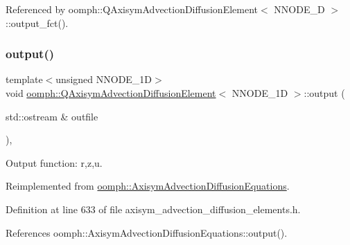 Referenced by oomph\+::\+Q\+Axisym\+Advection\+Diffusion\+Element$<$ N\+N\+O\+D\+E\+\_\+D $>$\+::output\+\_\+fct().

\mbox{\label{classoomph_1_1QAxisymAdvectionDiffusionElement_a398cd25b07bc4709163369e2db6e8202}} 
\subsubsection{\texorpdfstring{output()}{output()}\hspace{0.1cm}{\footnotesize\ttfamily [1/4]}}
{\footnotesize\ttfamily template$<$unsigned N\+N\+O\+D\+E\+\_\+1D$>$ \\
void \hyperlink{classoomph_1_1QAxisymAdvectionDiffusionElement}{oomph\+::\+Q\+Axisym\+Advection\+Diffusion\+Element}$<$ N\+N\+O\+D\+E\+\_\+1D $>$\+::output (\begin{DoxyParamCaption}\item[{std\+::ostream \&}]{outfile }\end{DoxyParamCaption})\hspace{0.3cm}{\ttfamily [inline]}, {\ttfamily [virtual]}}



Output function\+: r,z,u. 



Reimplemented from \hyperlink{classoomph_1_1AxisymAdvectionDiffusionEquations_ae8cc538907edda147270ae26696919bd}{oomph\+::\+Axisym\+Advection\+Diffusion\+Equations}.



Definition at line 633 of file axisym\+\_\+advection\+\_\+diffusion\+\_\+elements.\+h.



References oomph\+::\+Axisym\+Advection\+Diffusion\+Equations\+::output().

\mbox{\label{classoomph_1_1QAxisymAdvectionDiffusionElement_a20cbe0ae52a064c6c5f6a065596beea5}} 
